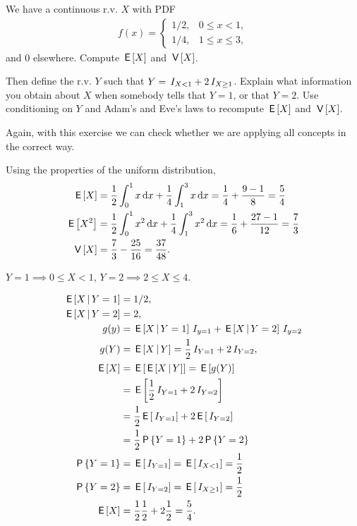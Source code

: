 \documentclass[lectures]{subfiles}
\begin{document}
\begin{exercise}
We have a continuous r.v. $X$ with PDF
\begin{align}
  \label{eq:23}
  f(x) =
  \begin{cases}
    1/2, & 0\leq x < 1, \\
    1/4, & 1\leq x \leq 3,
  \end{cases}
\end{align}
and $0$ elsewhere. Compute $\,\mathsf{E}\left[X\right]$ and $\,\mathsf{V}\left[X\right]$.

Then define the r.v.
$Y$ such that $Y=\,I_{X< 1} + 2\,I_{X\geq 1}$.
Explain what information you obtain about $X$ when somebody tells that $Y=1$, or that $Y=2$.
Use conditioning on $Y$ and Adam's and Eve's laws to recompute $\,\mathsf{E}\left[X\right]$ and $\,\mathsf{V}\left[X\right]$.

Again, with this exercise we can check whether we are applying all concepts in the correct way.
\begin{solution}

Using the properties of the uniform distribution,
\begin{align}
  \label{}
\,\mathsf{E}\left[X\right] &= \frac{1}{2} \int_0^1 x \,\textrm{d}x + \frac{1}{4} \int_1^3 x \,\textrm{d}x = \frac{1}{4} + \frac{9-1}{8} = \frac{5}{4} \\
\,\mathsf{E}\left[X^2\right] &=  \frac{1}{2}\int_0^{1} x^{2}\,\textrm{d}x + \frac{1}{4}\int_1^{3} x^{2}\,\textrm{d}x = \frac{1}{6} + \frac{27-1}{12} = \frac{7}{3} \\
\,\mathsf{V}\left[X\right] &=  \frac{7}{3} - \frac{25}{16} = \frac{37}{48}.
\end{align}

$Y=1 \implies 0\leq X< 1$,  $Y=2 \implies 2\leq X \leq 4$.

\begin{align}
  \label{}
\,\mathsf{E}\left[X\,\middle|\, Y=1\right] &= 1/2, \\
\,\mathsf{E}\left[X\,\middle|\, Y=2\right] &= 2, \\
g(y) &= \,\mathsf{E}\left[X\,\middle|\, Y=1\right]\,I_{y=1} + \,\mathsf{E}\left[X\,\middle|\, Y=2\right]\,I_{y=2}\\
g(Y) &= \,\mathsf{E}\left[X \,\middle|\, Y\right] = \frac{1}{2} \,I_{Y=1} + 2 \,I_{Y=2},\\
\,\mathsf{E}\left[X\right] &= \,\mathsf{E}\left[\,\mathsf{E}\left[X\,\middle|\, Y\right]\right] = \,\mathsf{E}\left[g(Y)\right] \\
&=\,\mathsf{E}\left[\frac{1}{2} \,I_{Y=1} + 2 \,I_{Y=2}\right] \\
&= \frac{1}{2} \,\mathsf{E}\left[\,I_{Y=1}\right] + 2 \,\mathsf{E}\left[\,I_{Y=2}\right] \\
&= \frac{1}{2} \,\mathsf{P}\left\{Y=1\right\} + 2 \,\mathsf{P}\left\{Y=2\right\} \\
\,\mathsf{P}\left\{Y=1\right\} &= \,\mathsf{E}\left[\,I_{Y=1}\right] = \,\mathsf{E}\left[\,I_{X<1}\right] = \frac{1}{2} \\
\,\mathsf{P}\left\{Y=2\right\} &= \,\mathsf{E}\left[\,I_{Y=2}\right] = \,\mathsf{E}\left[\,I_{X\geq 1}\right] = \frac{1}{2} \\
\,\mathsf{E}\left[X\right] &= \frac{1}{2} \frac{1}{2} + 2 \frac{1}{2} = \frac{5}{4}.
\end{align}



\end{solution}
\end{exercise}
\end{document}
